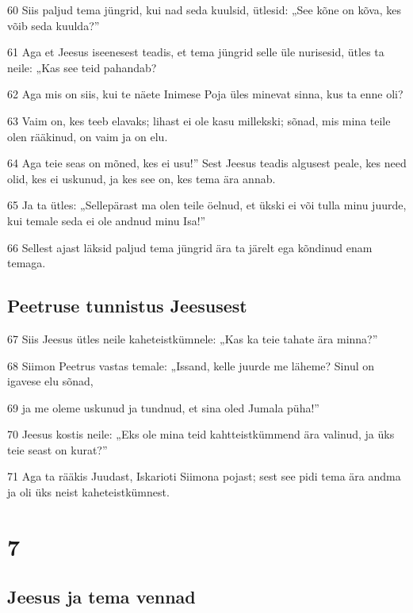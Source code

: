 \par 60 Siis paljud tema jüngrid, kui nad seda kuulsid, ütlesid: „See kõne on kõva, kes võib seda kuulda?”
\par 61 Aga et Jeesus iseenesest teadis, et tema jüngrid selle üle nurisesid, ütles ta neile: „Kas see teid pahandab?
\par 62 Aga mis on siis, kui te näete Inimese Poja üles minevat sinna, kus ta enne oli?
\par 63 Vaim on, kes teeb elavaks; lihast ei ole kasu millekski; sõnad, mis mina teile olen rääkinud, on vaim ja on elu.
\par 64 Aga teie seas on mõned, kes ei usu!” Sest Jeesus teadis algusest peale, kes need olid, kes ei uskunud, ja kes see on, kes tema ära annab.
\par 65 Ja ta ütles: „Sellepärast ma olen teile öelnud, et ükski ei või tulla minu juurde, kui temale seda ei ole andnud minu Isa!”
\par 66 Sellest ajast läksid paljud tema jüngrid ära ta järelt ega kõndinud enam temaga.

\section*{Peetruse tunnistus Jeesusest}

\par 67 Siis Jeesus ütles neile kaheteistkümnele: „Kas ka teie tahate ära minna?”
\par 68 Siimon Peetrus vastas temale: „Issand, kelle juurde me läheme? Sinul on igavese elu sõnad,
\par 69 ja me oleme uskunud ja tundnud, et sina oled Jumala püha!”
\par 70 Jeesus kostis neile: „Eks ole mina teid kahtteistkümmend ära valinud, ja üks teie seast on kurat?”
\par 71 Aga ta rääkis Juudast, Iskarioti Siimona pojast; sest see pidi tema ära andma ja oli üks neist kaheteistkümnest.


\chapter{7}

\section*{Jeesus ja tema vennad}

